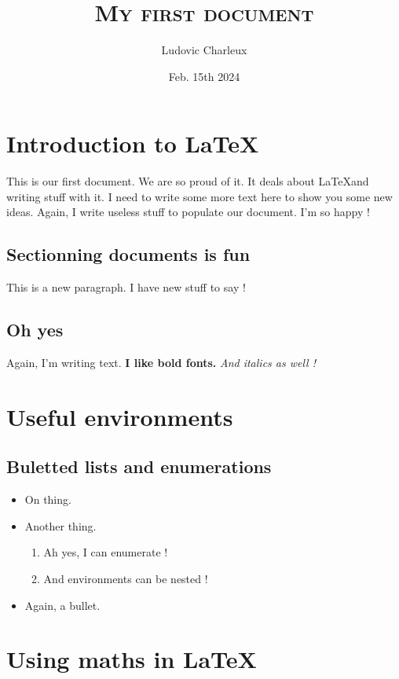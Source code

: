 \documentclass[10pt,a4paper,twoside]{article}
\author{Ludovic Charleux}
\title{\textsc{My first document}}
\date{Feb. 15th 2024}
\begin{document}
\maketitle

\tableofcontents

\section{Introduction to \LaTeX}
This is our first document.
We are so proud of it.
It deals about \LaTeX and writing stuff with it.
I need to write some more text here to show you some new ideas.
Again, I write useless stuff to populate our document.
I'm so happy !

\subsection{Sectionning documents is fun}
This is a new paragraph.
I have new stuff to say !

\subsection{Oh yes}
Again, I'm writing text.
\textbf{I like bold fonts.} %
\textit{And italics as well !} %

\section{Useful environments}

\subsection{Buletted lists and enumerations}

\begin{itemize}
  \item On thing.
  \item Another thing.
        \begin{enumerate}
          \item Ah yes, I can enumerate !
          \item And environments can be nested !
        \end{enumerate}
  \item Again, a bullet.
\end{itemize}

\section{Using maths in \LaTeX}
\end{document}
